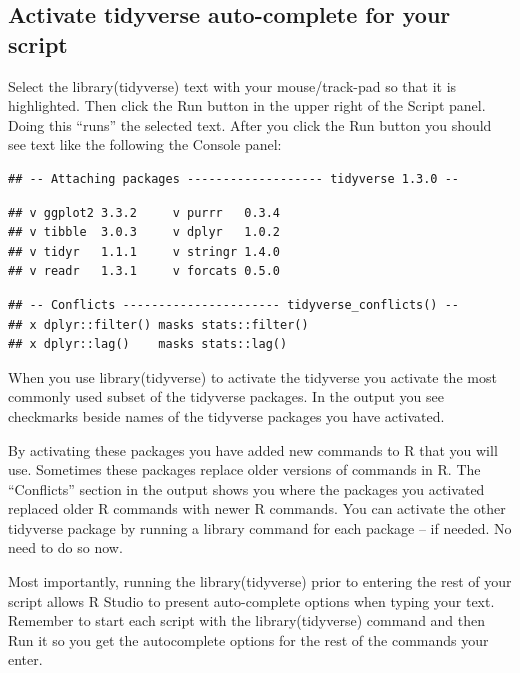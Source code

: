 \documentclass[
]{krantz}
\begin{document}
\hypertarget{activate-tidyverse-auto-complete-for-your-script}{%
\subsection{Activate tidyverse auto-complete for your script}\label{activate-tidyverse-auto-complete-for-your-script}}

Select the library(tidyverse) text with your mouse/track-pad so that it is highlighted. Then click the Run button in the upper right of the Script panel. Doing this ``runs'' the selected text. After you click the Run button you should see text like the following the Console panel:

\begin{verbatim}
## -- Attaching packages ------------------- tidyverse 1.3.0 --
\end{verbatim}

\begin{verbatim}
## v ggplot2 3.3.2     v purrr   0.3.4
## v tibble  3.0.3     v dplyr   1.0.2
## v tidyr   1.1.1     v stringr 1.4.0
## v readr   1.3.1     v forcats 0.5.0
\end{verbatim}

\begin{verbatim}
## -- Conflicts ---------------------- tidyverse_conflicts() --
## x dplyr::filter() masks stats::filter()
## x dplyr::lag()    masks stats::lag()
\end{verbatim}

When you use library(tidyverse) to activate the tidyverse you activate the most commonly used subset of the tidyverse packages. In the output you see checkmarks beside names of the tidyverse packages you have activated.

By activating these packages you have added new commands to R that you will use. Sometimes these packages replace older versions of commands in R. The ``Conflicts'' section in the output shows you where the packages you activated replaced older R commands with newer R commands. You can activate the other tidyverse package by running a library command for each package -- if needed. No need to do so now.

Most importantly, running the library(tidyverse) prior to entering the rest of your script allows R Studio to present auto-complete options when typing your text. Remember to start each script with the library(tidyverse) command and then Run it so you get the autocomplete options for the rest of the commands your enter.
\end{document}
